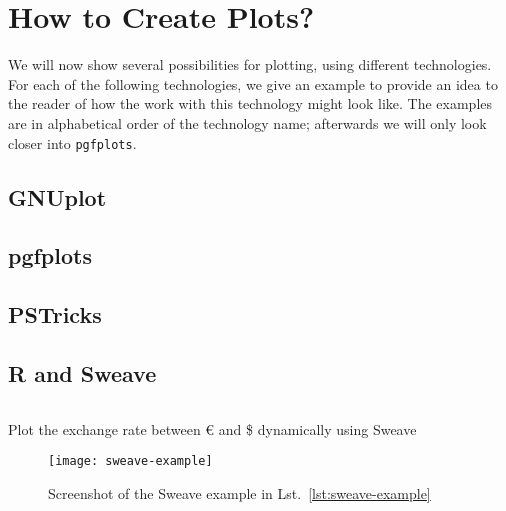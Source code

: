\section{How to Create Plots?}

We will now show several possibilities for plotting, using different
technologies. For each of the following technologies, we give an example to
provide an idea to the reader of how the work with this technology might look
like. The examples are in alphabetical order of the technology name; afterwards
we will only look closer into \texttt{pgfplots}.

\subsection{GNUplot}

\subsection{pgfplots}

\subsection{PSTricks}

\subsection{R and Sweave}

\begin{listing}[H]
  \inputminted{latex}{../examples/sweave-example.Snw}
  \caption{Plot the exchange rate between \euro{} and \$ dynamically using
    Sweave}
  \label{lst:sweave-example}
\end{listing}
\begin{figure}[t]
  \texttt{[image: sweave-example]}
  \caption{Screenshot of the Sweave example in Lst.~\ref{lst:sweave-example}}
  \label{fig:sweave-example}
\end{figure}
